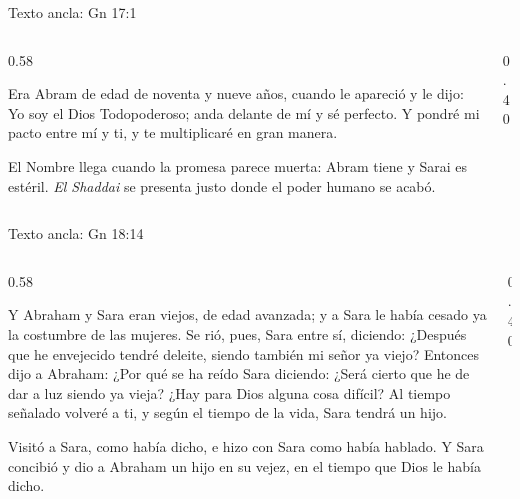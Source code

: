 \begin{frame}{Texto ancla: Gn 17:1}
\begin{columns}[c,onlytextwidth]
\begin{column}{0.58\textwidth}
\begin{center}\end{center}
\begin{cita}Era Abram de edad de noventa y nueve años, cuando le apareció \SENOR{} y le dijo: Yo soy el Dios Todopoderoso; anda delante de mí y sé perfecto. Y pondré mi pacto entre mí y ti, y te multiplicaré en gran manera.\end{cita}
\small\RaggedRight El Nombre llega cuando la promesa parece muerta: Abram tiene  y Sarai es estéril. \emph{El Shaddai} se presenta justo donde el poder humano se acabó.
\end{column}
\begin{column}{0.40\textwidth}\end{column}
\end{columns}
\end{frame}

\begin{frame}{Texto ancla: Gn 18:14}
\begin{columns}[c,onlytextwidth]
\begin{column}{0.58\textwidth}
\begin{cita}[fontupper=\scriptsize\itshape]Y Abraham y Sara eran viejos, de edad avanzada; y a Sara le había cesado ya la costumbre de las mujeres. Se rió, pues, Sara entre sí, diciendo: ¿Después que he envejecido tendré deleite, siendo también mi señor ya viejo? Entonces \SENOR{} dijo a Abraham: ¿Por qué se ha reído Sara diciendo: ¿Será cierto que he de dar a luz siendo ya vieja? ¿Hay para Dios alguna cosa difícil? Al tiempo señalado volveré a ti, y según el tiempo de la vida, Sara tendrá un hijo.\end{cita}
\begin{cita}[fontupper=\scriptsize\itshape]Visitó \SENOR{} a Sara, como había dicho, e hizo \SENOR{} con Sara como había hablado. Y Sara concibió y dio a Abraham un hijo en su vejez, en el tiempo que Dios le había dicho.\end{cita}
\end{column}
\begin{column}{0.40\textwidth}\end{column}
\end{columns}
\end{frame}

